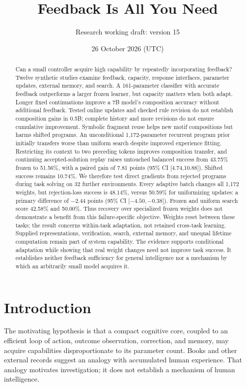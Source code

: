 \documentclass[11pt]{article}
\title{Feedback Is All You Need}
\author{Research working draft: version 15}
\date{26 October 2026 (UTC)}
\begin{document}
\maketitle
\begin{abstract}
Can a small controller acquire high capability by repeatedly incorporating
feedback? Twelve synthetic studies examine feedback, capacity, response
interfaces, parameter updates, external memory, and search. A 161-parameter
classifier with accurate feedback outperforms a larger frozen learner, but
capacity matters when both adapt. Longer fixed continuations improve a 7B
model's composition accuracy without additional feedback. Tested online
updates and checked rule revision do not establish composition gains in 0.5B;
complete history and more revisions do not ensure cumulative improvement.
Symbolic fragment reuse helps new motif compositions but harms shifted
programs. An unconditional 1,172-parameter recurrent program prior initially
transfers worse than uniform search despite improved experience fitting.
Restricting its context to two preceding tokens improves composition transfer,
and continuing accepted-solution replay raises untouched balanced success
from 43.75\% frozen to 51.56\%, with a paired gain of 7.81 points
(95\% CI [4.74,10.88]). Shifted success remains 10.74\%.
We therefore test direct gradients from rejected programs during task solving
on 32 further environments. Every adaptive batch changes all 1,172 weights,
but rejection-loss success is 48.14\%, versus 50.59\% for uniformizing updates:
a primary difference of $-2.44$ points (95\% CI [$-4.50,-0.38$]). Frozen and
uniform search score 42.58\% and 50.00\%. Thus recovery over specialized frozen
weights does not demonstrate a benefit from this failure-specific objective.
Weights reset between these tasks; the result concerns within-task adaptation,
not retained cross-task learning. Supplied representations, verification,
search, external memory, and unequal lifetime computation remain part of
system capability. The evidence supports conditional adaptation while
showing that real weight changes need not improve task success. It establishes
neither feedback sufficiency for general intelligence nor a mechanism by which
an arbitrarily small model acquires it.
\end{abstract}

\section{Introduction}
The motivating hypothesis is that a compact cognitive core, coupled to an
efficient loop of action, outcome observation, correction, and memory, may
acquire capabilities disproportionate to its parameter count. Books and other
external records suggest an analogy with accumulated human experience. That
analogy motivates investigation; it does not establish a mechanism of human
intelligence.
\end{document}
